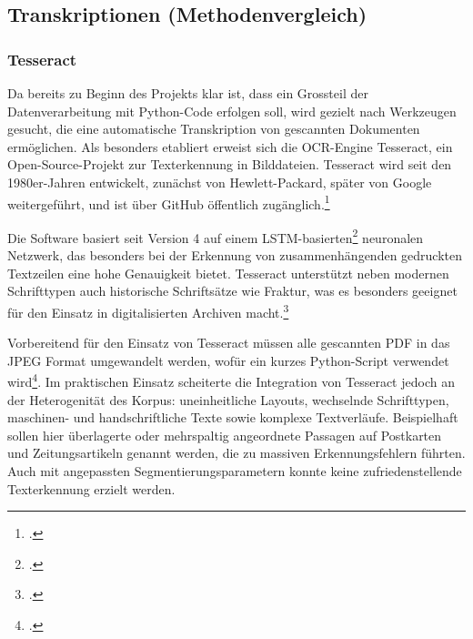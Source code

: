 \documentclass[12pt, a4paper, ngerman, bidi=default]{article}
\let\cite\footcite
\begin{document}
 


\subsection{Transkriptionen (Methodenvergleich)}\label{section:Transkriptionen_Methoden}
\subsubsection{Tesseract}\label{subsubsection:Tesseract}

Da bereits zu Beginn des Projekts klar ist, dass ein Grossteil der Datenverarbeitung mit Python-Code erfolgen soll, wird gezielt 
nach Werkzeugen gesucht, die eine automatische Transkription von gescannten Dokumenten ermöglichen. 
Als besonders etabliert erweist sich die OCR-Engine Tesseract, ein Open-Source-Projekt zur Texterkennung in Bilddateien. 
Tesseract wird seit den 1980er-Jahren entwickelt, zunächst von Hewlett-Packard, später von Google weitergeführt, 
und ist über GitHub öffentlich zugänglich.\cite[vgl.][]{weil_tesseract-ocrtesseract_2025}

Die Software basiert seit Version 4 auf einem LSTM-basierten\cite[Abk.: \textbf{LSTM} steht für \textit{Long Short-Term Memory};  Architektur der frühen Generation rekurrenter neuronaler Netzwerke \textit{RNNs}. LSTMs wurden entwickelt, um Sequenzdaten zu verarbeiten und dabei sowohl kurzfristige als auch langfristige Abhängigkeiten in der Datenfolge zu erfassen – ein typisches Beispiel sind Texte, Sprache, Zeitreihen oder Handschrift. ;vgl.][p.1-2]{beck_review_2020} neuronalen Netzwerk, das besonders bei der Erkennung von zusammenhängenden gedruckten Textzeilen eine 
hohe Genauigkeit bietet. Tesseract unterstützt neben modernen Schrifttypen auch historische Schriftsätze wie Fraktur, was es besonders geeignet 
für den Einsatz in digitalisierten Archiven macht.\cite[vgl.][]{weil_tesseract-ocrtesseract_2025}

Vorbereitend für den Einsatz von Tesseract müssen alle gescannten PDF in das JPEG Format umgewandelt werden, wofür ein kurzes Python-Script verwendet wird\cite[vgl.][]{burkhardt_githubpdf_to_jpegpy_2025}. 
Im praktischen Einsatz scheiterte die Integration von Tesseract jedoch an der Heterogenität des Korpus: uneinheitliche Layouts, wechselnde 
Schrifttypen, maschinen- und handschriftliche Texte sowie komplexe Textverläufe. Beispielhaft sollen hier überlagerte oder mehrspaltig angeordnete 
Passagen auf Postkarten und Zeitungsartikeln genannt werden, die zu massiven Erkennungsfehlern führten. Auch mit angepassten Segmentierungsparametern konnte keine zufriedenstellende Texterkennung erzielt werden.
\end{document}
